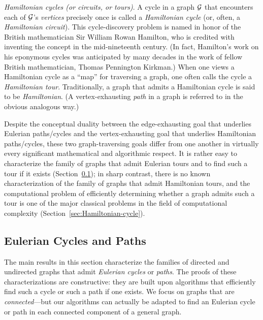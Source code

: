 \medskip

 
 
 

{\it Hamiltonian cycles (or circuits, or tours)}.
A cycle in a graph $\mbox{$\cal G$}$ that encounters each of $\mbox{$\cal G$}$'s {\em vertices} precisely once is called a {\it Hamiltonian cycle} (or, often, a {\it Hamiltonian circuit}).  This cycle-discovery problem is named in honor of the British mathematician Sir William Rowan Hamilton, who is credited with inventing the concept in the mid-nineteenth century.  (In fact, Hamilton's work on his eponymous cycles was anticipated by many decades in the work of fellow British mathematician, Thomas Pennington Kirkman.)  When one views a Hamiltonian cycle as a ``map'' for traversing a graph, one often calls the cycle a {\it Hamiltonian tour}.  Traditionally, a graph that admits a Hamiltonian cycle is said to be {\it Hamiltonian}.  (A vertex-exhausting {\em path} in a graph is referred to in the obvious analogous way.)  

\bigskip

Despite the conceptual duality between the edge-exhausting goal that underlies Eulerian paths/cycles and the vertex-exhausting goal that underlies Hamiltonian paths/cycles, these two graph-traversing goals differ from one another in virtually every significant mathematical and algorithmic respect.  It is rather easy to characterize the family of graphs that admit Eulerian tours and to find such a tour if it exists (Section~\ref{sec:EulerianCycle}); in sharp contrast, there is no known characterization of the family of graphs that admit Hamiltonian tours, and the computational problem of efficiently determining whether a graph admits such a tour is one of the major classical problems in the field of computational complexity  (Section~\ref{sec:Hamiltonian-cycle}).


\subsection{Eulerian Cycles and Paths}
\label{sec:EulerianCycle}

The main results in this section characterize the families of directed and undirected graphs that admit {\it Eulerian cycles} or {\it paths}.  The proofs of these characterizations are constructive: they are built upon algorithms that efficiently find such a cycle or such a path if one exists.  We focus on graphs that are {\em connected}---but our algorithms can actually be adapted to find an Eulerian cycle or path in each connected component of a general graph.

